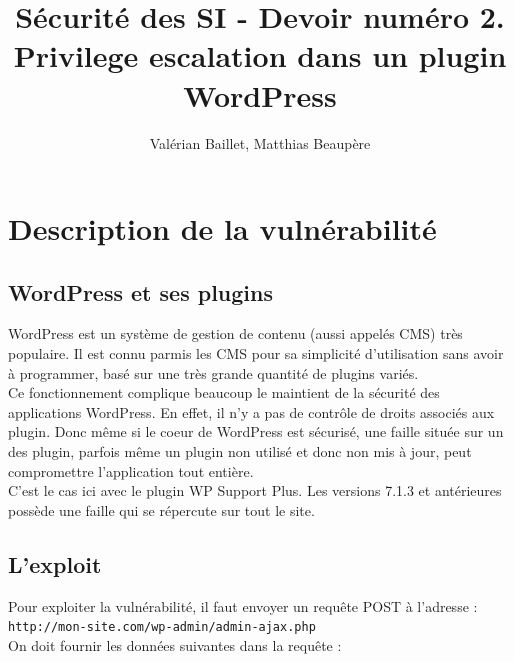 \documentclass[a4,12pt]{article}
\begin{document}
\begin{titlepage}
  \title{
    Sécurité des SI - Devoir numéro 2. \\
    Privilege escalation dans un plugin WordPress
  }
  \author{Valérian Baillet, Matthias Beaupère}
  \date{}
\end{titlepage}

\maketitle

\hspace{50px}

\section{Description de la vulnérabilité}

\subsection{WordPress et ses plugins}

WordPress est un système de gestion de contenu (aussi appelés CMS) très populaire. Il est connu parmis les CMS pour sa simplicité d'utilisation sans avoir à programmer, basé sur une très grande quantité de plugins variés.\\

Ce fonctionnement complique beaucoup le maintient de la sécurité des applications WordPress. En effet, il n'y a pas de contrôle de droits associés aux plugin. Donc même si le coeur de WordPress est sécurisé, une faille située sur un des plugin, parfois même un plugin non utilisé et donc non mis à jour, peut compromettre l'application tout entière.\\

C'est le cas ici avec le plugin WP Support Plus. Les versions 7.1.3 et antérieures possède une faille qui se répercute sur tout le site.

\subsection{L'exploit}


Pour exploiter la vulnérabilité, il faut envoyer un requ\^ete POST à l'adresse : \\
\texttt{http://mon-site.com/wp-admin/admin-ajax.php}\\

On doit fournir les données suivantes dans la requête :\\
\end{document}
